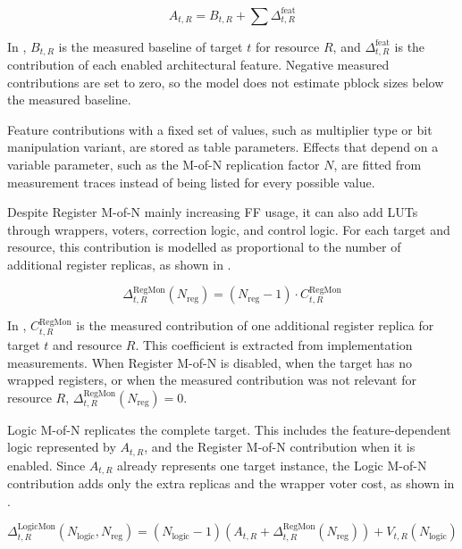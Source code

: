 \begin{equation}
A_{t,R} =
B_{t,R}
+
\sum \Delta^{\text{feat}}_{t,R}
\label{eq:pblock_target_base}
\end{equation}

In , \(B_{t,R}\) is the measured baseline of target \(t\) for resource \(R\), and \(\Delta^{\text{feat}}_{t,R}\) is the contribution of each enabled architectural feature. Negative measured contributions are set to zero, so the model does not estimate pblock sizes below the measured baseline.

Feature contributions with a fixed set of values, such as multiplier type or bit manipulation variant, are stored as table parameters. Effects that depend on a variable parameter, such as the M-of-N replication factor \(N\), are fitted from measurement traces instead of being listed for every possible value.


Despite Register M-of-N mainly increasing \ac{FF} usage, it can also add \acp{LUT} through wrappers, voters, correction logic, and control logic. For each target and resource, this contribution is modelled as proportional to the number of additional register replicas, as shown in .

\begin{equation}
\Delta^{\text{RegMon}}_{t,R}(N_{\text{reg}})
=
(N_{\text{reg}} - 1)
\cdot
C^{\text{RegMon}}_{t,R}
\label{eq:pblock_reg_mon}
\end{equation}

In , \(C^{\text{RegMon}}_{t,R}\) is the measured contribution of one additional register replica for target \(t\) and resource \(R\). This coefficient is extracted from implementation measurements. When Register M-of-N is disabled, when the target has no wrapped registers, or when the measured contribution was not relevant for resource \(R\), \(\Delta^{\text{RegMon}}_{t,R}(N_{\text{reg}})=0\).

Logic M-of-N replicates the complete target. This includes the feature-dependent logic represented by \(A_{t,R}\), and the Register M-of-N contribution when it is enabled. Since \(A_{t,R}\) already represents one target instance, the Logic M-of-N contribution adds only the extra replicas and the wrapper voter cost, as shown in .

\begin{equation}
\Delta^{\text{LogicMon}}_{t,R}(N_{\text{logic}},N_{\text{reg}})
=
(N_{\text{logic}}-1)
\left(
A_{t,R}
+
\Delta^{\text{RegMon}}_{t,R}(N_{\text{reg}})
\right)
+
V_{t,R}(N_{\text{logic}})
\label{eq:pblock_logic_mon}
\end{equation}

